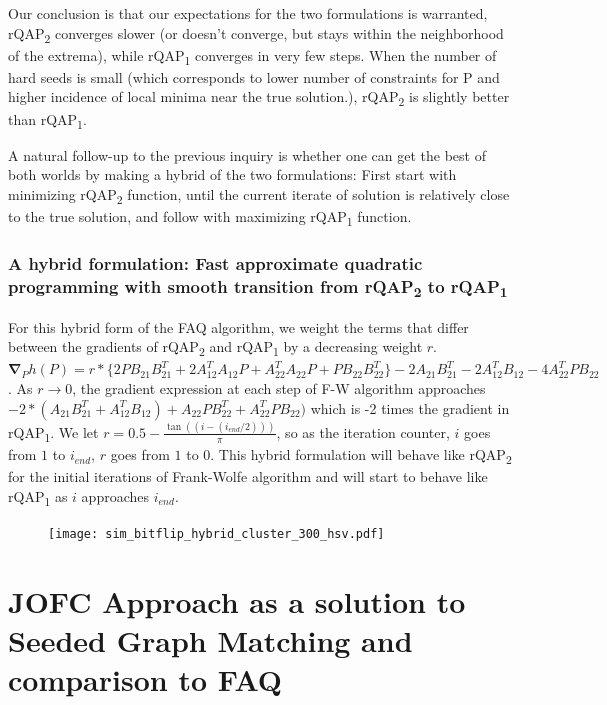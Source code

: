 \documentclass[12pt,oneside,final]{thesis}\usepackage[]{graphicx}\usepackage[]{color}
\begin{document}
Our conclusion is that our expectations for the two formulations is warranted, rQAP\textsubscript{2}   converges slower (or doesn't converge, but stays within the neighborhood of the extrema), while rQAP\textsubscript{1} converges in very few steps. When the number of hard seeds is small (which corresponds to lower number of constraints for P and higher incidence of local minima near the true solution.), rQAP\textsubscript{2} is slightly better than rQAP\textsubscript{1}.


A natural follow-up to the previous inquiry is whether one can get the best of both worlds by making a hybrid of the two formulations: First start with minimizing rQAP\textsubscript{2} function, until the current iterate of solution is relatively close to the true solution, and follow with maximizing rQAP\textsubscript{1} function. 


\subsection{A hybrid formulation: Fast approximate quadratic programming with smooth transition from rQAP\textsubscript{2} to rQAP\textsubscript{1} \label{subsec:hybrid}}

For this hybrid form of the FAQ algorithm, we weight the terms that differ between the gradients of  rQAP\textsubscript{2} and rQAP\textsubscript{1} by a decreasing weight $r$. $\boldsymbol{\nabla}_{P}h(P)=
r*\{2PB_{21}B_{21}^{T}
+2A_{12}^{T}A_{12}P
+A_{22}^{T}A_{22}P
+PB_{22}B_{22}^{T}\}
-2A_{21}B_{21}^{T}-2A_{12}^{T}B_{12}
-4A_{22}^{T}PB_{22}$. As $r \rightarrow 0 $, the gradient expression at each step of F-W algorithm approaches
$-2*(A_{21}B_{21}^T+A_{12}^TB_{12})+A_{22}PB_{22}^T+A_{22}^TPB_{22})$ which is -2 times the gradient in rQAP\textsubscript{1}. We let $r= 0.5- \frac{\tan((i-(i_{end}/2)))}{\pi}$, so as the iteration counter, $i$ goes from $1$ to $i_{end}$, $r$ goes from $1$ to $0$. This hybrid formulation will behave like rQAP\textsubscript{2} for the initial iterations of Frank-Wolfe algorithm and will start to behave like rQAP\textsubscript{1} as $i$ approaches $i_{end}$.


\begin{figure}
 \centering
  \caption{
 \label{fig:hybrid}}
 \texttt{[image: sim\_bitflip\_hybrid\_cluster\_300\_hsv.pdf]}
\end{figure}



\chapter{JOFC Approach as a solution to Seeded Graph Matching and comparison to FAQ}
\label{sec:sgm-jofc}
\end{document}
